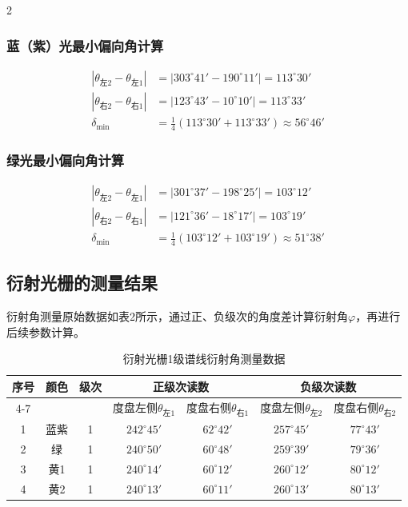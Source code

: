 \documentclass[12pt,a4paper]{article}
\begin{document}
\begin{multicols}{2}
    \subsubsection{蓝（紫）光最小偏向角计算}
    \[
    \begin{aligned}
    |\theta_{\text{左}2} - \theta_{\text{左}1}| &= |303^\circ41' - 190^\circ11'| = 113^\circ30' \\
    |\theta_{\text{右}2} - \theta_{\text{右}1}| &= |123^\circ43' - 10^\circ10'| = 113^\circ33' \\
    \delta_{\text{min}} &= \frac{1}{4}\left(113^\circ30' + 113^\circ33'\right) \approx 56^\circ46'
    \end{aligned}
    \]

    \subsubsection{绿光最小偏向角计算}
    \[
    \begin{aligned}
    |\theta_{\text{左}2} - \theta_{\text{左}1}| &= |301^\circ37' - 198^\circ25'| = 103^\circ12' \\
    |\theta_{\text{右}2} - \theta_{\text{右}1}| &= |121^\circ36' - 18^\circ17'| = 103^\circ19' \\
    \delta_{\text{min}} &= \frac{1}{4}\left(103^\circ12' + 103^\circ19'\right) \approx 51^\circ38'
    \end{aligned}
    \]

\subsection{\heiti 衍射光栅的测量结果}
    \songti
    衍射角测量原始数据如表2所示，通过正、负级次的角度差计算衍射角$\varphi$，再进行后续参数计算。

    \begin{table}[htbp]
    \centering
    \caption{衍射光栅1级谱线衍射角测量数据}
    \songti
    \begin{tabular}{c|c|c|cc|cc}
    \toprule
    序号 & 颜色 & 级次 & \multicolumn{2}{c|}{正级次读数} & \multicolumn{2}{c}{负级次读数} \\
    \cline{4-7}
    & & & 度盘左侧$\theta_{\text{左}1}$ & 度盘右侧$\theta_{\text{右}1}$ & 度盘左侧$\theta_{\text{左}2}$ & 度盘右侧$\theta_{\text{右}2}$ \\
    \midrule
    1 & 蓝紫 & 1 & $242^\circ45'$ & $62^\circ42'$ & $257^\circ45'$ & $77^\circ43'$ \\
    2 & 绿 & 1 & $240^\circ50'$ & $60^\circ48'$ & $259^\circ39'$ & $79^\circ36'$ \\
    3 & 黄1 & 1 & $240^\circ14'$ & $60^\circ12'$ & $260^\circ12'$ & $80^\circ12'$ \\
    4 & 黄2 & 1 & $240^\circ13'$ & $60^\circ11'$ & $260^\circ13'$ & $80^\circ13'$ \\
    \bottomrule
    \end{tabular}
    \label{tab:grating_data}
    \end{table}


\end{multicols}
\end{document}
